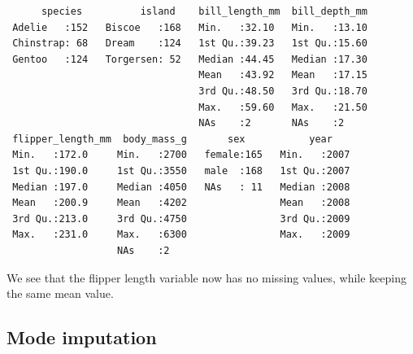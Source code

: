 \documentclass[
  letterpaper,
  DIV=11,
  numbers=noendperiod]{scrreprt}
\newenvironment{Shaded}{\begin{snugshade}}{\end{snugshade}}
\newcommand{\AttributeTok}[1]{\textcolor[rgb]{0.40,0.45,0.13}{#1}}
\newcommand{\CommentTok}[1]{\textcolor[rgb]{0.37,0.37,0.37}{#1}}
\newcommand{\ConstantTok}[1]{\textcolor[rgb]{0.56,0.35,0.01}{#1}}
\newcommand{\FunctionTok}[1]{\textcolor[rgb]{0.28,0.35,0.67}{#1}}
\newcommand{\NormalTok}[1]{\textcolor[rgb]{0.00,0.23,0.31}{#1}}
\newcommand{\OtherTok}[1]{\textcolor[rgb]{0.00,0.23,0.31}{#1}}
\newcommand{\SpecialCharTok}[1]{\textcolor[rgb]{0.37,0.37,0.37}{#1}}
\begin{document}
\begin{Shaded}
\end{Shaded}

\begin{verbatim}
      species          island    bill_length_mm  bill_depth_mm  
 Adelie   :152   Biscoe   :168   Min.   :32.10   Min.   :13.10  
 Chinstrap: 68   Dream    :124   1st Qu.:39.23   1st Qu.:15.60  
 Gentoo   :124   Torgersen: 52   Median :44.45   Median :17.30  
                                 Mean   :43.92   Mean   :17.15  
                                 3rd Qu.:48.50   3rd Qu.:18.70  
                                 Max.   :59.60   Max.   :21.50  
                                 NAs    :2       NAs    :2      
 flipper_length_mm  body_mass_g       sex           year     
 Min.   :172.0     Min.   :2700   female:165   Min.   :2007  
 1st Qu.:190.0     1st Qu.:3550   male  :168   1st Qu.:2007  
 Median :197.0     Median :4050   NAs   : 11   Median :2008  
 Mean   :200.9     Mean   :4202                Mean   :2008  
 3rd Qu.:213.0     3rd Qu.:4750                3rd Qu.:2009  
 Max.   :231.0     Max.   :6300                Max.   :2009  
                   NAs    :2                                 
\end{verbatim}

We see that the flipper length variable now has no missing values, while
keeping the same mean value.

\subsection{Mode imputation}\label{mode-imputation}
\end{document}
